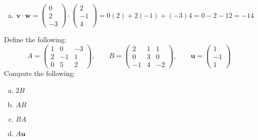 \documentclass[11pt,letterpaper]{article}
\begin{document}
\begin{enumerate}[(a)]
\item 
	\[
	\mathbf{v} \cdot \mathbf{w}= \begin{pmatrix} 0 \\ 2 \\ -3 \end{pmatrix} \cdot \begin{pmatrix} 2 \\ -1 \\ 4 \end{pmatrix}= 0(2) + 2(-1) + (-3)4= 0 - 2 - 12= -14
	\]
\end{enumerate}



\newpage



 Define the following:
	\[
	A= \begin{pmatrix} 1 & 0 & -3 \\ 2 & -1 & 1 \\ 0 & 5 & 2 \end{pmatrix}, \qquad
	B= \begin{pmatrix} 2 & 1 & 1 \\ 0 & 3 & 0 \\ -1 & 4 & -2 \end{pmatrix}, \qquad
	\mathbf{u}= \begin{pmatrix} 1 \\ -1 \\ 1 \end{pmatrix}
	\]
Compute the following:
	\begin{enumerate}[(a)]
	\item $2B$
	\item $AB$
	\item $BA$
	\item $A \mathbf{u}$
	\end{enumerate} \pspace
\end{document}
